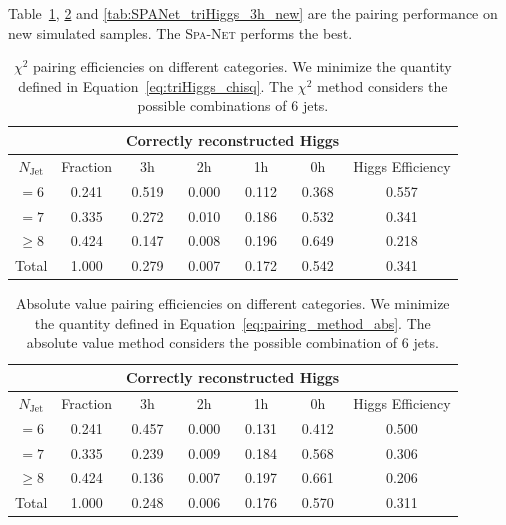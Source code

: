 \documentclass[12pt]{article}
\begin{document}
    Table~\ref{tab:chi2_pairing_triHiggs_3h_new}, \ref{tab:chi2_abs_pairing_triHiggs_3h_new} and \ref{tab:SPANet_triHiggs_3h_new} are the pairing performance on new simulated samples. The \textsc{Spa-Net} performs the best.
    \begin{table}[htpb]
		\centering
        \caption{$\chi^2$ pairing efficiencies on different categories. We minimize the quantity defined in Equation~\ref{eq:triHiggs_chisq}. The $\chi^2$ method considers the possible combinations of 6 jets.}
		\label{tab:chi2_pairing_triHiggs_3h_new}
		\begin{tabular}{c|c|cccc|c}
        \multicolumn{1}{l|}{} &          & \multicolumn{4}{c|}{Correctly reconstructed Higgs} & \multicolumn{1}{l}{} \\ \hline
        $N_\text{Jet}$        & Fraction & 3h          & 2h         & 1h         & 0h         & Higgs Efficiency     \\ \hline
        $=6$                  & 0.241    & 0.519       & 0.000      & 0.112      & 0.368      & 0.557                \\
        $=7$                  & 0.335    & 0.272       & 0.010      & 0.186      & 0.532      & 0.341                \\
        $\ge 8$               & 0.424    & 0.147       & 0.008      & 0.196      & 0.649      & 0.218                \\ \hline
        Total                 & 1.000    & 0.279       & 0.007      & 0.172      & 0.542      & 0.341               
		\end{tabular}
	\end{table}
    \begin{table}[htpb]
		\centering
		\caption{Absolute value pairing efficiencies on different categories. We minimize the quantity defined in Equation~\ref{eq:pairing_method_abs}. The absolute value method considers the possible combination of 6 jets.}
		\label{tab:chi2_abs_pairing_triHiggs_3h_new}
		\begin{tabular}{c|c|cccc|c}
			\multicolumn{1}{l|}{} &          & \multicolumn{4}{c|}{Correctly reconstructed Higgs} & \multicolumn{1}{l}{} \\ \hline
			$N_\text{Jet}$        & Fraction & 3h          & 2h         & 1h         & 0h         & Higgs Efficiency     \\ \hline
			$=6$                  & 0.241    & 0.457 & 0.000 & 0.131 & 0.412 &  0.500                \\
			$=7$                  & 0.335    & 0.239 & 0.009 & 0.184 & 0.568 &  0.306                \\
			$\ge 8$               & 0.424    & 0.136 & 0.007 & 0.197 & 0.661 &  0.206                \\ \hline
			Total                 & 1.000    & 0.248 & 0.006 & 0.176 & 0.570 &  0.311               
		\end{tabular}
	\end{table}
\end{document}
